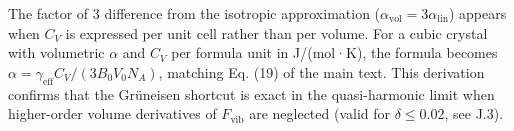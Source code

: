 \documentclass[aps,prb,reprint,amsmath,amssymb,floatfix]{revtex4-2}
\begin{document}
The factor of 3 difference from the isotropic approximation
(\(\alpha_\text{vol} = 3\alpha_\text{lin}\)) appears when \(C_V\) is
expressed per unit cell rather than per volume. For a cubic crystal with
volumetric \(\alpha\) and \(C_V\) per formula unit in J/(mol·K), the
formula becomes \(\alpha = \gamma_\text{eff} C_V/(3B_0 V_0 N_A)\),
matching Eq. (19) of the main text. This derivation confirms that the
Grüneisen shortcut is exact in the quasi-harmonic limit when
higher-order volume derivatives of \(F_\text{vib}\) are neglected (valid
for \(\delta \leq 0.02\), see J.3).




\end{document}
